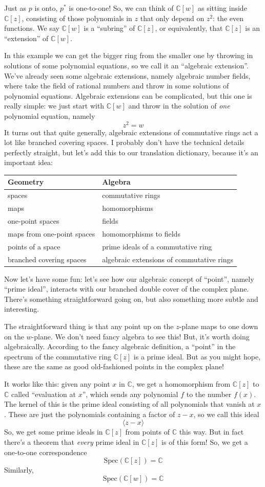 \documentclass{article}
\begin{document}
Just as \(p\) is onto, \(p^*\) is one-to-one! So, we can think of
\(\mathbb{C}[w]\) as sitting inside \(\mathbb{C}[z]\), consisting of
those polynomials in \(z\) that only depend on \(z^2\): the even
functions. We say \(\mathbb{C}[w]\) is a ``subring'' of
\(\mathbb{C}[z]\), or equivalently, that \(\mathbb{C}[z]\) is an
``extension'' of \(\mathbb{C}[w]\).

In this example we can get the bigger ring from the smaller one by
throwing in solutions of some polynomial equations, so we call it an
``algebraic extension''. We've already seen some algebraic extensions,
namely algebraic number fields, where take the field of rational numbers
and throw in some solutions of polynomial equations. Algebraic
extensions can be complicated, but this one is really simple: we just
start with \(\mathbb{C}[w]\) and throw in the solution of \emph{one}
polynomial equation, namely \[z^2 = w\] It turns out that quite
generally, algebraic extensions of commutative rings act a lot like
branched covering spaces. I probably don't have the technical details
perfectly straight, but let's add this to our translation dictionary,
because it's an important idea:

\begin{longtable}[]{@{}ll@{}}
\toprule
Geometry & Algebra\tabularnewline
\midrule
\endhead
spaces & commutative rings\tabularnewline
maps & homomorphisms\tabularnewline
one-point spaces & fields\tabularnewline
maps from one-point spaces & homomorphisms to fields\tabularnewline
points of a space & prime ideals of a commutative ring\tabularnewline
branched covering spaces & algebraic extensions of commutative
rings\tabularnewline
\bottomrule
\end{longtable}

Now let's have some fun: let's see how our algebraic concept of
``point'', namely ``prime ideal'', interacts with our branched double
cover of the complex plane. There's something straightforward going on,
but also something more subtle and interesting.

The straightforward thing is that any point up on the \(z\)-plane maps
to one down on the \(w\)-plane. We don't need fancy algebra to see this!
But, it's worth doing algebraically. According to the fancy algebraic
definition, a ``point'' in the spectrum of the commutative ring
\(\mathbb{C}[z]\) is a prime ideal. But as you might hope, these are the
same as good old-fashioned points in the complex plane!

It works like this: given any point \(x\) in \(\mathbb{C}\), we get a
homomorphism from \(\mathbb{C}[z]\) to \(\mathbb{C}\) called
``evaluation at \(x\)'', which sends any polynomial \(f\) to the number
\(f(x)\). The kernel of this is the prime ideal consisting of all
polynomials that vanish at \(x\). These are just the polynomials
containing a factor of \(z - x\), so we call this ideal
\[\langle z - x\rangle\] So, we get some prime ideals in
\(\mathbb{C}[z]\) from points of \(\mathbb{C}\) this way. But in fact
there's a theorem that \emph{every} prime ideal in \(\mathbb{C}[z]\) is
of this form! So, we get a one-to-one correspondence
\[\mathrm{Spec}(\mathbb{C}[z]) = \mathbb{C}\] Similarly,
\[\mathrm{Spec}(\mathbb{C}[w]) = \mathbb{C}\]
\end{document}
